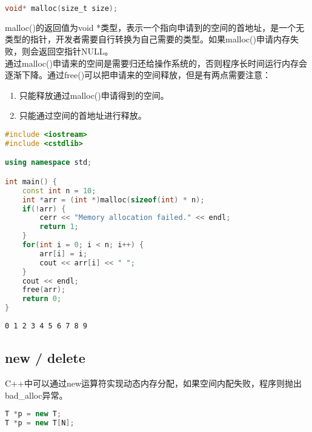 \begin{lstlisting}[language=C]
void* malloc(size_t size);
\end{lstlisting}

malloc()的返回值为void *类型，表示一个指向申请到的空间的首地址，是一个无类型的指针，开发者需要自行转换为自己需要的类型。如果malloc()申请内存失败，则会返回空指针NULL。 \\

通过malloc()申请来的空间是需要归还给操作系统的，否则程序长时间运行内存会逐渐下降。通过free()可以把申请来的空间释放，但是有两点需要注意：

\begin{enumerate}
    \item 只能释放通过malloc()申请得到的空间。
    \item 只能通过空间的首地址进行释放。
\end{enumerate}


\begin{lstlisting}[language=C++]
#include <iostream>
#include <cstdlib>

using namespace std;

int main() {
    const int n = 10;
    int *arr = (int *)malloc(sizeof(int) * n);
    if(!arr) {
        cerr << "Memory allocation failed." << endl;
        return 1;
    }
    for(int i = 0; i < n; i++) {
        arr[i] = i;
        cout << arr[i] << " ";
    }
    cout << endl;
    free(arr);
    return 0;
}
\end{lstlisting}

\begin{tcolorbox}
    \begin{verbatim}
0 1 2 3 4 5 6 7 8 9
	\end{verbatim}
\end{tcolorbox}

\subsection{new / delete}

C++中可以通过new运算符实现动态内存分配，如果空间内配失败，程序则抛出bad\_alloc异常。

\vspace{-0.5cm}

\begin{lstlisting}[language=C++]
T *p = new T;
T *p = new T[N];
\end{lstlisting}

